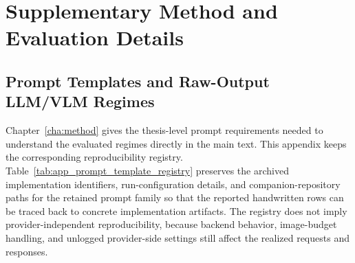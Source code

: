
\chapter{Supplementary Method and Evaluation Details}
\label{cha:appendix_audit}

\section{Prompt Templates and Raw-Output LLM/VLM Regimes}
\label{sec:appendix_prompt_templates}

Chapter~\ref{cha:method} gives the thesis-level prompt requirements needed to understand the evaluated regimes directly in the main text. This appendix keeps the corresponding reproducibility registry. Table~\ref{tab:app_prompt_template_registry} preserves the archived implementation identifiers, run-configuration details, and companion-repository paths for the retained prompt family so that the reported handwritten rows can be traced back to concrete implementation artifacts. The registry does not imply provider-independent reproducibility, because backend behavior, image-budget handling, and unlogged provider-side settings still affect the realized requests and responses.

